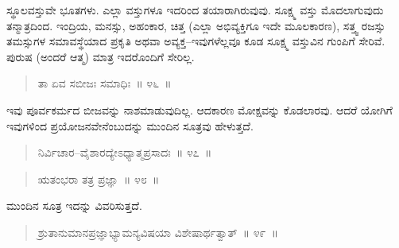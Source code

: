 
\vspace{0.2cm}

ಸ್ಥೂಲವಸ್ತುವೇ ಭೂತಗಳು. ಎಲ್ಲಾ ವಸ್ತುಗಳೂ ಇದರಿಂದ ತಯಾರಾಗಿರುವುವು. ಸೂಕ್ಷ್ಮ ವಸ್ತು ಮೊದಲಾಗುವುದು ತನ್ಮಾತ್ರದಿಂದ. ಇಂದ್ರಿಯ, ಮನಸ್ಸು, ಅಹಂಕಾರ, ಚಿತ್ತ (ಎಲ್ಲಾ ಅಭಿವ್ಯಕ್ತಿಗೂ ಇದೇ ಮೂಲಕಾರಣ), ಸತ್ತ್ವ ರಜಸ್ಸು ತಮಸ್ಸುಗಳ ಸಮಾವಸ್ಥೆಯಾದ ಪ್ರಕೃತಿ ಅಥವಾ ಅವ್ಯಕ್ತ–ಇವುಗಳೆಲ್ಲವೂ ಕೂಡ ಸೂಕ್ಷ್ಮ ವಸ್ತುವಿನ ಗುಂಪಿಗೆ ಸೇರಿವೆ. ಪುರುಷ (ಅಂದರೆ ಆತ್ಮ) ಮಾತ್ರ ಇದರೊಂದಿಗೆ ಸೇರಿಲ್ಲ.

\begin{verse}
ತಾ ಏವ ಸಬೀಜಃ ಸಮಾಧಿಃ~॥ ೪೬~॥
\end{verse}

\vspace{-0.4cm}


\newpage

ಇವು ಪೂರ್ವಕರ್ಮದ ಬೀಜವನ್ನು ನಾಶಮಾಡುವುದಿಲ್ಲ. ಆದಕಾರಣ ಮೋಕ್ಷವನ್ನು ಕೊಡಲಾರವು. ಆದರೆ ಯೋಗಿಗೆ ಇವುಗಳಿಂದ ಪ್ರಯೋಜನವೇನೆಂಬುದನ್ನು ಮುಂದಿನ ಸೂತ್ರವು ಹೇಳುತ್ತದೆ. 

\vspace{-0.2cm}

\begin{verse}
ನಿರ್ವಿಚಾರ–ವೈಶಾರದ್ಯೇಽಧ್ಯಾತ್ಮಪ್ರಸಾದಃ~॥ ೪೭~॥
\end{verse}

\vspace{-0.4cm}


\vspace{-0.1cm}

\begin{verse}
ಋತಂಭರಾ ತತ್ರ ಪ್ರಜ್ಞಾ~॥ ೪೮~॥
\end{verse}

\vspace{-0.4cm}


\vspace{0.2cm}

ಮುಂದಿನ ಸೂತ್ರ ಇದನ್ನು ವಿವರಿಸುತ್ತದೆ. 

\vspace{-0.2cm}

\begin{verse}
ಶ್ರುತಾನುಮಾನಪ್ರಜ್ಞಾಭ್ಯಾಮನ್ಯವಿಷಯಾ ವಿಶೇಷಾರ್ಥತ್ವಾತ್​~॥ ೪೯~॥
\end{verse}

\vspace{-0.4cm}

